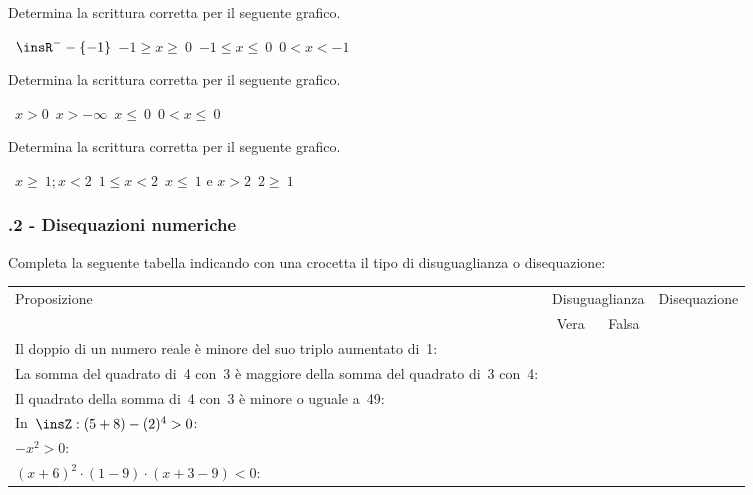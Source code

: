 \begin{esercizio}
 \label{ese:21.5}
Determina la scrittura corretta per il seguente grafico.
 \begin{center}
  

  \boxA\quad~$\insR^{-}-\{-1\}$\quad\boxB\quad~$-1\ge x\ge~0$\quad\boxC\quad~$-1\le x\le~0$\quad\boxD\quad~$0<x<-1$
 \end{center}
 \end{esercizio}

\begin{esercizio}
 \label{ese:21.6}
Determina la scrittura corretta per il seguente grafico.
 \begin{center}
  

  \boxA\quad~$x>0$\quad\boxB\quad~$x>-\infty $\quad\boxC\quad~$x\le~0$\quad\boxD\quad~$0<x\le~0$
 \end{center}
  \end{esercizio}

\begin{esercizio}
 \label{ese:21.7}
Determina la scrittura corretta per il seguente grafico.
 \begin{center}
  

  \boxA\quad~$x\ge~1;x<2$\quad\boxB\quad~$1\le x<2$\quad\boxC\quad~$x\le~1\text{ e }x>2$\quad\boxD\quad~$2\ge~1$
 \end{center}
  \end{esercizio}

\subsubsection*{\thechapter.2 - Disequazioni numeriche}
\begin{esercizio}
 \label{ese:21.8}
Completa la seguente tabella indicando con una crocetta il tipo di
disuguaglianza o disequazione:

 \begin{tabularx}{.9\textwidth}{Xccc}
 \toprule
 Proposizione&\multicolumn{2}{c}{Disuguaglianza}& Disequazione\\
  & Vera & Falsa & \\
 \midrule
 Il doppio di un numero reale è minore del suo triplo aumentato di~1: & & & \\
 La somma del quadrato di~4 con~3 è maggiore della somma del quadrato di~3 con~4: & & &\\
 Il quadrato della somma di~4 con~3 è minore o uguale a~49: & & & \\
 In~$\insZ:(5+8)-(2)^{4}>0$: & & & \\
 $-x^{2}>0$: & & & \\
 $(x+6)^{2}\cdot (1-9)\cdot (x+3-9)<0$: & & & \\
 \bottomrule
 \end{tabularx}
\end{esercizio}

